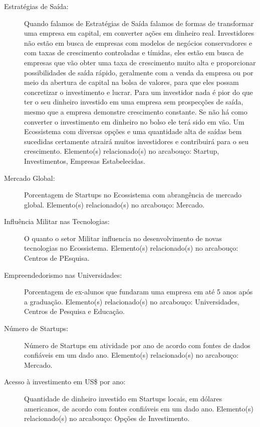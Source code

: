 \begin{description}

  \item [Estratégias de Saída:] Quando falamos de Estratégias de Saída falamos de formas de transformar uma empresa em capital, em converter ações em dinheiro real. Investidores não estão em busca de empresas com modelos de negócios conservadores e com taxas de crescimento controladas e tímidas, eles estão em busca de empresas que vão obter uma taxa de crescimento muito alta e proporcionar possibilidades de saída rápido, geralmente com a venda da empresa ou por meio da abertura de capital na bolsa de valores, para que eles possam concretizar o investimento e lucrar. Para um investidor nada é pior do que ter o seu dinheiro investido em uma empresa sem prospecções de saída, mesmo que a empresa demonstre crescimento constante. Se não há como converter o investimento em dinheiro no bolso ele terá sido em vão. Um Ecossistema com diversas opções e uma quantidade alta de saídas bem sucedidas certamente atrairá muitos investidores e contribuirá para o seu crescimento. Elemento(s) relacionado(s) no arcabouço: Startup, Investimentos, Empresas Estabelecidas.

  \item [Mercado Global:] Porcentagem de Startups no Ecossistema com abrangência de mercado global. Elemento(s) relacionado(s) no arcabouço: Mercado.

  \item [Influência Militar nas Tecnologias: ] O quanto o setor Militar influencia no desenvolvimento de novas tecnologias no Ecossistema. Elemento(s) relacionado(s) no arcabouço: Centros de PEsquisa.

  \item [Empreendedorismo nas Universidades:] Porcentagem de ex-alunos que fundaram uma empresa em até 5 anos após a graduação. Elemento(s) relacionado(s) no arcabouço: Universidades, Centros de Pesquisa e Educação.

  \item [Número de Startups:] Número de Startups em atividade por ano de acordo com fontes de dados confiáveis em um dado ano. Elemento(s) relacionado(s) no arcabouço: Mercado.

  \item [Acesso à investimento em US\$ por ano:] Quantidade de dinheiro investido em Startups locais, em dólares americanos, de acordo com fontes confiáveis em um dado ano. Elemento(s) relacionado(s) no arcabouço: Opções de Investimento. 


\end{description}
